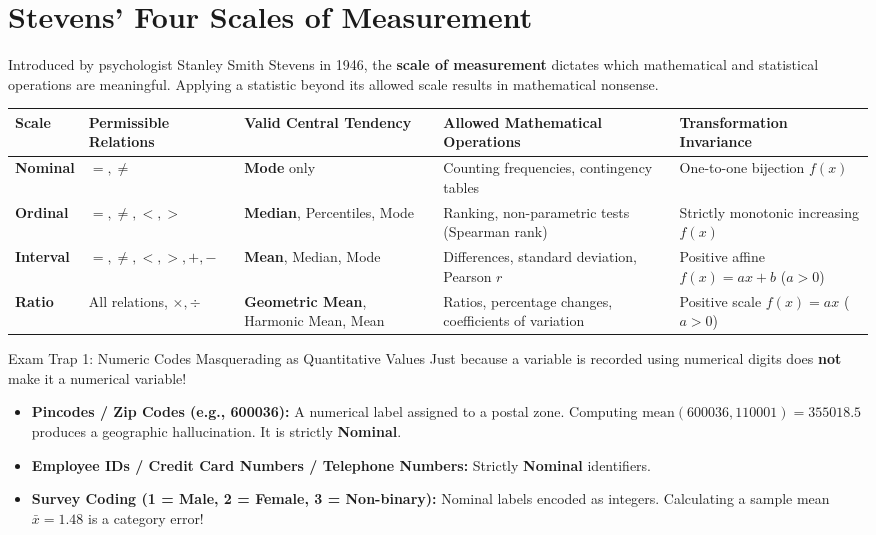 \section{Stevens' Four Scales of Measurement}

Introduced by psychologist Stanley Smith Stevens in 1946, the \textbf{scale of measurement} dictates which mathematical and statistical operations are meaningful. Applying a statistic beyond its allowed scale results in mathematical nonsense.

\begin{center}
\renewcommand{\arraystretch}{1.3}
\begin{tabular}{p{2.2cm}p{2.8cm}p{3.2cm}p{3.5cm}p{3.0cm}}
\toprule
\textbf{Scale} & \textbf{Permissible Relations} & \textbf{Valid Central Tendency} & \textbf{Allowed Mathematical Operations} & \textbf{Transformation Invariance} \\
\midrule
\textbf{Nominal} & $=, \neq$ & \textbf{Mode} only & Counting frequencies, contingency tables & One-to-one bijection $f(x)$ \\
\textbf{Ordinal} & $=, \neq, <, >$ & \textbf{Median}, Percentiles, Mode & Ranking, non-parametric tests (Spearman rank) & Strictly monotonic increasing $f(x)$ \\
\textbf{Interval} & $=, \neq, <, >, +, -$ & \textbf{Mean}, Median, Mode & Differences, standard deviation, Pearson $r$ & Positive affine $f(x) = ax + b$ ($a > 0$) \\
\textbf{Ratio} & All relations, $\times, \div$ & \textbf{Geometric Mean}, Harmonic Mean, Mean & Ratios, percentage changes, coefficients of variation & Positive scale $f(x) = ax$ ($a > 0$) \\
\bottomrule
\end{tabular}
\end{center}

\begin{trapbox}{Exam Trap 1: Numeric Codes Masquerading as Quantitative Values}
Just because a variable is recorded using numerical digits does \textbf{not} make it a numerical variable!
\begin{itemize}
    \item \textbf{Pincodes / Zip Codes (e.g., 600036):} A numerical label assigned to a postal zone. Computing $\text{mean}(600036, 110001) = 355018.5$ produces a geographic hallucination. It is strictly \textbf{Nominal}.
    \item \textbf{Employee IDs / Credit Card Numbers / Telephone Numbers:} Strictly \textbf{Nominal} identifiers.
    \item \textbf{Survey Coding (1 = Male, 2 = Female, 3 = Non-binary):} Nominal labels encoded as integers. Calculating a sample mean $\bar{x} = 1.48$ is a category error!
\end{itemize}
\end{trapbox}

